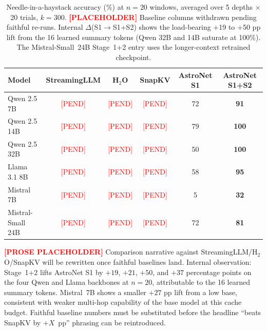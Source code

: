 \begin{table}[t]
\caption{Needle-in-a-haystack accuracy (\%) at $n{=}20$ windows, averaged over 5 depths $\times$ 20 trials, $k{=}300$. \textcolor{red}{\textbf{[PLACEHOLDER]}} Baseline columns withdrawn pending faithful re-runs. Internal $\Delta$(S1$\to$S1+S2) shows the load-bearing $+$19 to $+$50 pp lift from the 16 learned summary tokens (Qwen 32B and 14B saturate at 100\%). The Mistral-Small~24B Stage~1+2 entry uses the longer-context retrained checkpoint.}
\label{tab:needle}
\centering
\small
\setlength{\tabcolsep}{6pt}
\begin{tabular}{l c c c c c}
\toprule
\textbf{Model} & \textbf{StreamingLLM} & \textbf{H${}_2$O} & \textbf{SnapKV} & \textbf{AstroNet S1} & \textbf{AstroNet S1+S2} \\
\midrule
Qwen 2.5 7B       & \textcolor{red}{[PEND]} & \textcolor{red}{[PEND]} & \textcolor{red}{[PEND]} & 72 & \textbf{91} \\
Qwen 2.5 14B      & \textcolor{red}{[PEND]} & \textcolor{red}{[PEND]} & \textcolor{red}{[PEND]} & 79 & \textbf{100} \\
Qwen 2.5 32B      & \textcolor{red}{[PEND]} & \textcolor{red}{[PEND]} & \textcolor{red}{[PEND]} & 50 & \textbf{100} \\
Llama 3.1 8B      & \textcolor{red}{[PEND]} & \textcolor{red}{[PEND]} & \textcolor{red}{[PEND]} & 58 & \textbf{95} \\
Mistral 7B        & \textcolor{red}{[PEND]} & \textcolor{red}{[PEND]} & \textcolor{red}{[PEND]} & 5 & \textbf{32} \\
Mistral-Small 24B & \textcolor{red}{[PEND]} & \textcolor{red}{[PEND]} & \textcolor{red}{[PEND]} & 72 & \textbf{81} \\
\bottomrule
\end{tabular}
\end{table}

\textcolor{red}{\textbf{[PROSE PLACEHOLDER]}} Comparison narrative against StreamingLLM/H$_2$O/SnapKV will be rewritten once faithful baselines land. Internal observation: Stage~1+2 lifts AstroNet S1 by $+19$, $+21$, $+50$, and $+37$ percentage points on the four Qwen and Llama backbones at $n{=}20$, attributable to the 16 learned summary tokens. Mistral~7B shows a smaller $+27$ pp lift from a low base, consistent with weaker multi-hop capability of the base model at this cache budget. Faithful baseline numbers must be substituted before the headline ``beats SnapKV by $+X$~pp'' phrasing can be reintroduced.


